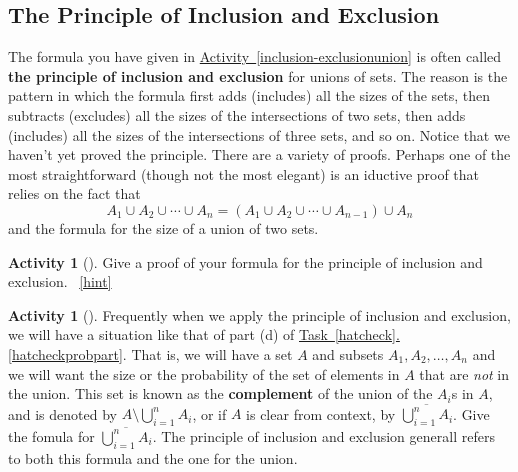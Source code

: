 \documentclass[10pt,]{book}
\newcommand{\terminology}[1]{\textbf{#1}}
\theoremstyle{plain}
\theoremstyle{definition}
\theoremstyle{definition}
\theoremstyle{definition}
\newtheorem{activity}[project]{Activity}
\numberwithin{equation}{chapter}
\begin{document}
\subsection[{The Principle of Inclusion and Exclusion}]{The Principle of Inclusion and Exclusion}\label{subsection-28}
\hypertarget{p-1200}{}%
The formula you have given in \hyperref[inclusion-exclusionunion]{Activity~\ref{inclusion-exclusionunion}} is often called \terminology{the principle of inclusion and exclusion} for unions of sets. The reason is the pattern in which the formula first adds (includes) all the sizes of the sets, then subtracts (excludes) all the sizes of the intersections of two sets, then adds (includes) all the sizes of the intersections of three sets, and so on.   Notice that we haven't yet proved the principle. There are a variety of proofs.  Perhaps one of the most straightforward (though not the most elegant) is an iductive proof that relies on the fact that%
\begin{equation*}
A_1 \cup A_2 \cup \cdots \cup A_n = \left(A_1 \cup A_2 \cup \cdots \cup A_{n-1}\right) \cup A_n
\end{equation*}
and the formula for the size of a union of two sets.%
\begin{activity}[]\label{activity-216}
\hypertarget{p-1201}{}%
Give a proof of your formula for the principle of inclusion and exclusion.%
~\hfill{\tiny\hyperlink{a-223}{[hint]}\hypertarget{q-223}{}}\end{activity}
\begin{activity}[]\label{compunion}
\hypertarget{p-1205}{}%
Frequently when we apply the principle of inclusion and exclusion, we will have a situation like that of part (d) of \hyperref[hatcheckprobpart]{Task~\ref{hatcheck}.\ref{hatcheckprobpart}}.  That is, we will have a set \(A\) and subsets \(A_1, A_2, \ldots, A_n\) and we will want the size or the probability of the set of elements in \(A\) that are \emph{not} in the union.  This set is known as the \terminology{complement}  of the union of the \(A_i\)s in \(A\), and is denoted by \(A \setminus \bigcup_{i=1}^n A_i\), or if \(A\) is clear from context, by \(\overline{\bigcup_{i=1}^n A_i}\). Give the fomula for \(\overline{\bigcup_{i=1}^n A_i}\).  The principle of inclusion and exclusion generall refers to both this formula and the one for the union.%
\end{activity}
\hypertarget{p-1207}{}%
\end{document}
